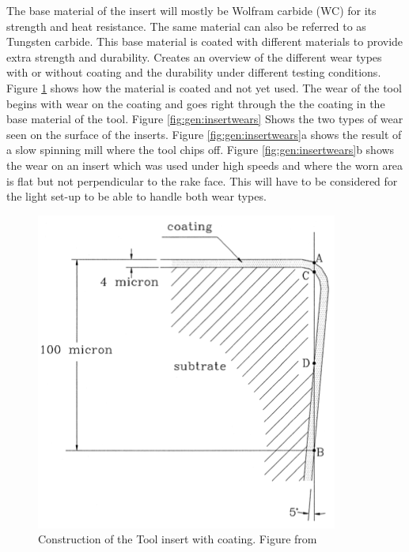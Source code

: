 	The base material of the insert will mostly be Wolfram carbide (WC) for its strength and heat resistance. The same material can also be referred to as Tungsten carbide. This base material is coated with different materials to provide extra strength and durability.
	\cite{Gu1999} Creates an overview of the different wear types with or without coating and the durability under different testing conditions. Figure \ref{fig:alg:insertConstruction} shows how the material is coated and not yet used. 
	The wear of the tool begins with wear on the coating and goes right through the the coating in the base material of the tool. 
	Figure \ref{fig:gen:insertwears} Shows the two types of wear seen on the surface of the inserts. Figure \ref{fig:gen:insertwears}a shows the result of a slow spinning mill where the tool chips off. Figure \ref{fig:gen:insertwears}b shows the wear on an insert which was used under high speeds and where the worn area is flat but not perpendicular to the rake face. This will have to be considered for the light set-up to be able to handle both wear types.
	
	
	\begin{figure}[hbtp]
	\centering
	\includegraphics[scale=0.5]{fig/algemeen/plaatjes/Figuren/Insert_construction.png}
	\caption{Construction of the Tool insert with coating. Figure from \citep{Gu1999}}
	\label{fig:alg:insertConstruction}
	\end{figure}
	
